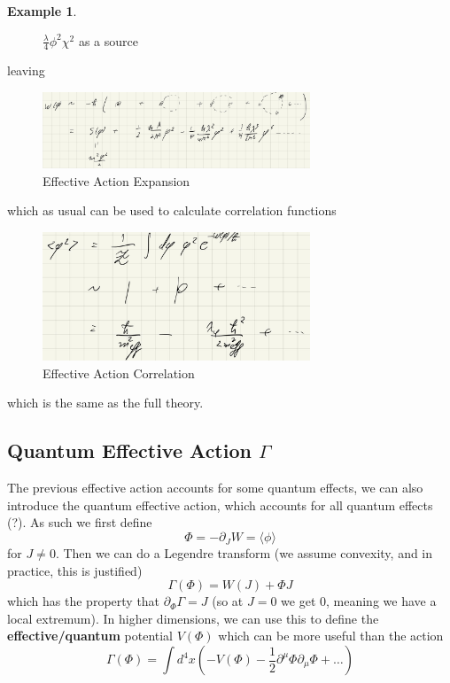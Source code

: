 \documentclass{article}
\theoremstyle{definition}
\newtheorem{example}{Example}
\begin{document}
\begin{example}
\begin{figure}[H]
    \caption{$\frac{\lambda}{4} \phi^2 \chi^2$ as a source}
    \label{lec_5_effective_source}
  \end{figure}
  leaving
  \begin{figure}[H]
    \centering
    \includegraphics[width=8cm]{res/AQFT/lec_5_effective_pertubation}
    \caption{Effective Action Expansion}
    \label{lec_5_effective_pertubation}
  \end{figure}
  which as usual can be used to calculate correlation functions
  \begin{figure}[H]
    \centering
    \includegraphics[width=8cm]{res/AQFT/lec_5_effective_correlation}
    \caption{Effective Action Correlation}
    \label{lec_5_effective_correlation}
  \end{figure}
  which is the same as the full theory.
\end{example}

\subsection{Quantum Effective Action $\Gamma$}

The previous effective action accounts for some quantum effects, we can also
introduce the quantum effective action, which accounts for all quantum effects
(?). As such we first define
\begin{equation}
  \Phi = -\partial_J W = \langle \phi \rangle
\end{equation}
for $J \neq 0$. Then we can do a Legendre transform (we assume convexity, and in
practice, this is justified)
\begin{equation}
  \Gamma(\Phi) = W(J) + \Phi J
\end{equation}
which has the property that $\partial_\Phi \Gamma = J$ (so at $J = 0$ we get
$0$, meaning we have a local extremum). In higher dimensions, we can use this to
define the \textbf{effective/quantum} potential $V(\Phi)$ which can be more useful than
the action
\begin{equation}
  \Gamma(\Phi) = \int d^4x \left( -V(\Phi)
    - \frac{1}{2} \partial^\mu \Phi \partial_\mu \Phi + \dots \right)
\end{equation}
\end{document}
